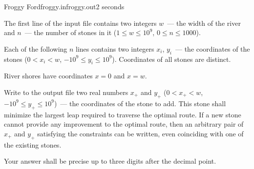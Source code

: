 \begin{problem}{Froggy Ford}{froggy.in}{froggy.out}{2 seconds}
\InputFile

The first line of the input file contains two integers $w$~--- 
the width of the river and $n$~--- the number of stones in it
($1 \le w \le 10^9$, $0 \le n \le 1000$).

Each of the following $n$ lines contains two integers $x_i$, $y_i$~--- 
the coordinates of the stones ($0 < x_i < w$, $-10^{9} \le y_i \le 10^9$).
Coordinates of all stones are distinct.

River shores have coordinates $x=0$ and $x=w$.

\OutputFile

Write to the output file two real numbers $x_+$ and $y_+$
($0 < x_+ < w$, $-10^{9} \le y_+ \le 10^9$)~--- 
the coordinates of the stone to add. This stone shall minimize
the largest leap required to traverse the optimal route.
If a new stone cannot provide any improvement to the optimal route, 
then an arbitrary pair of $x_+$ and $y_+$ 
satisfying the constraints can be written, even coinciding with one of the existing stones. 

Your answer shall be precise up to three digits after the decimal point.

\Example

\begin{example}%
%
\end{example}

\end{problem}
